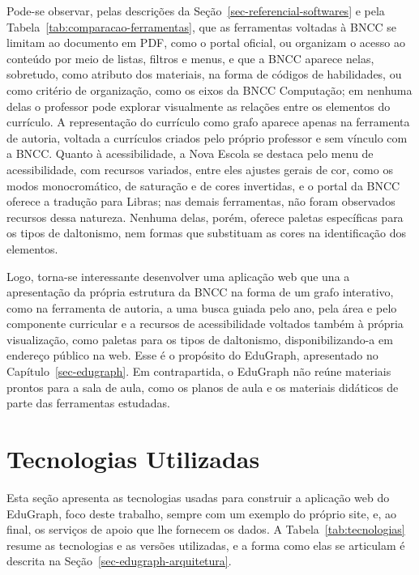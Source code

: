 Pode-se observar, pelas descrições da Seção~\ref{sec-referencial-softwares} e pela Tabela~\ref{tab:comparacao-ferramentas}, que as ferramentas voltadas à BNCC se limitam ao documento em PDF, como o portal oficial, ou organizam o acesso ao conteúdo por meio de listas, filtros e menus, e que a BNCC aparece nelas, sobretudo, como atributo dos materiais, na forma de códigos de habilidades, ou como critério de organização, como os eixos da BNCC Computação; em nenhuma delas o professor pode explorar visualmente as relações entre os elementos do currículo. A representação do currículo como grafo aparece apenas na ferramenta de autoria, voltada a currículos criados pelo próprio professor e sem vínculo com a BNCC. Quanto à acessibilidade, a Nova Escola se destaca pelo menu de acessibilidade, com recursos variados, entre eles ajustes gerais de cor, como os modos monocromático, de saturação e de cores invertidas, e o portal da BNCC oferece a tradução para Libras; nas demais ferramentas, não foram observados recursos dessa natureza. Nenhuma delas, porém, oferece paletas específicas para os tipos de daltonismo, nem formas que substituam as cores na identificação dos elementos.

Logo, torna-se interessante desenvolver uma aplicação web que una a apresentação da própria estrutura da BNCC na forma de um grafo interativo, como na ferramenta de autoria, a uma busca guiada pelo ano, pela área e pelo componente curricular e a recursos de acessibilidade voltados também à própria visualização, como paletas para os tipos de daltonismo, disponibilizando-a em endereço público na web. Esse é o propósito do EduGraph, apresentado no Capítulo~\ref{sec-edugraph}. Em contrapartida, o EduGraph não reúne materiais prontos para a sala de aula, como os planos de aula e os materiais didáticos de parte das ferramentas estudadas.


\section{Tecnologias Utilizadas}
\label{sec-referencial-tecnologias}

Esta seção apresenta as tecnologias usadas para construir a aplicação web do EduGraph, foco deste trabalho, sempre com um exemplo do próprio site, e, ao final, os serviços de apoio que lhe fornecem os dados. A Tabela~\ref{tab:tecnologias} resume as tecnologias e as versões utilizadas, e a forma como elas se articulam é descrita na Seção~\ref{sec-edugraph-arquitetura}.

